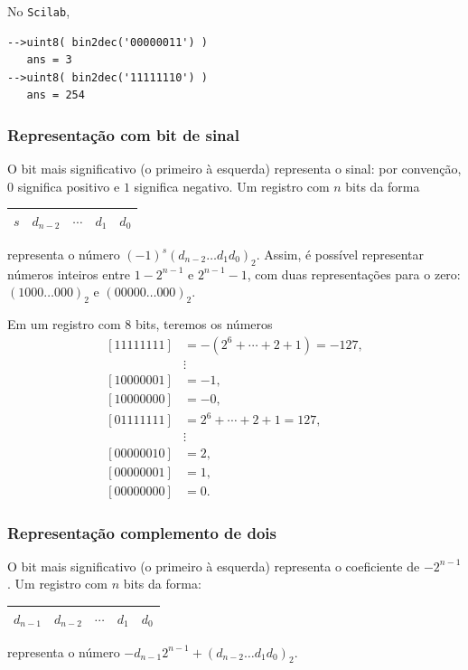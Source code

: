 \begin{ex}
  No \verb+Scilab+,
\begin{verbatim}
-->uint8( bin2dec('00000011') )
   ans = 3
-->uint8( bin2dec('11111110') )
   ans = 254
\end{verbatim}
\end{ex}


\subsubsection{Representação com bit de sinal}
O bit mais significativo (o primeiro à esquerda) representa o sinal: por convenção, $0$ significa positivo e $1$ significa negativo. Um registro com $n$ bits da forma
\begin{center}
  \begin{tabular}{|c|c|c|c|c|} \hline
    $s$ & $d_{n-2}$ & $\cdots$ & $d_1$ & $d_0$ \\\hline
  \end{tabular}
\end{center}
representa o número $(-1)^s(d_{n-2}\ldots d_1d_0)_2$. Assim, é possível representar números inteiros entre $1-2^{n-1}$ e $2^{n-1}-1$, com duas representações para o zero: $(1000\ldots 000)_2$ e $(00000\ldots 000)_2$.

\begin{ex}
Em um registro com $8$ bits, teremos os números
\begin{equation}
\begin{split}
 [11111111] &= -(2^{6}+\cdots+2+1)=-127,\\
 &\vdots    \\
 [10000001] &= -1, \\
 [10000000] &= -0, \\
 [01111111] &= 2^6+\cdots+2+1=127, \\
 &\vdots    \\
 [00000010] &= 2, \\
 [00000001] &= 1, \\
 [00000000] &= 0.
\end{split}
\end{equation}
\end{ex}


\subsubsection{Representação complemento de dois}
O bit mais significativo (o primeiro à esquerda) representa o coeficiente de $-2^{n-1}$.  Um registro com $n$ bits da forma:
\begin{center}
  \begin{tabular}{|c|c|c|c|c|} \hline
    $d_{n-1}$ & $d_{n-2}$ & $\cdots$ & $d_1$ & $d_0$\\\hline
  \end{tabular}
\end{center}
representa o número $-d_{n-1}2^{n-1}+(d_{n-2}\ldots d_1d_0)_2$.

